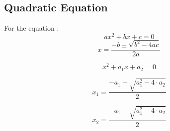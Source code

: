 \documentclass[12pt, a5paper]{article}
\begin{document}
\subsection*{Quadratic Equation}
\noindent For the equation :
$$\boxed{ ax^2 + bx + c = 0 }$$
$$x = \dfrac{-b \pm \sqrt{b^2 - 4ac}}{2a}$$

$$\boxed{ x^2 + a_1x + a_2 = 0 }$$

$$x_1 = \dfrac{-a_1 + \sqrt{a_{1}^2 - 4 \cdot a_2}}{2}$$

$$x_2 = \dfrac{-a_1 - \sqrt{a_{1}^2 - 4 \cdot a_2}}{2}$$
\end{document}
